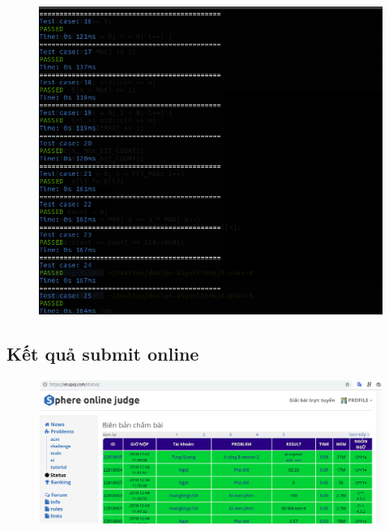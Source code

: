 \documentclass[../report.tex]{subfiles}
\begin{document}
\begin{figure}[H]
\centering
\includegraphics[width=\textwidth]{figures/test-a-plus-b-2.png}
\end{figure}

\subsection{Kết quả submit online}
\begin{figure}[H]
\centering
\includegraphics[width=\textwidth]{figures/submit-a-plus-b.png}
\end{figure}
\end{document}
